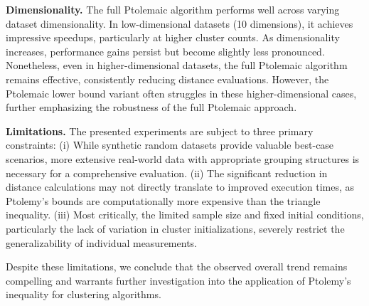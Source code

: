 \textbf{Dimensionality.} The full Ptolemaic algorithm performs well across varying dataset dimensionality. In low-dimensional datasets (10 dimensions), it achieves impressive speedups, particularly at higher cluster counts.
As dimensionality increases, performance gains persist but become slightly less pronounced.
Nonetheless, even in higher-dimensional datasets, the full Ptolemaic algorithm remains effective, consistently reducing distance evaluations.
However, the Ptolemaic lower bound variant often struggles in these higher-dimensional cases, further emphasizing the robustness of the full Ptolemaic approach.



\textbf{Limitations.}
The presented experiments are subject to three primary constraints:
(i) While synthetic random datasets provide valuable best-case scenarios, more extensive real-world data with appropriate grouping structures is necessary for a comprehensive evaluation.
(ii) The significant reduction in distance calculations may not directly translate to improved execution times, as Ptolemy's bounds are computationally more expensive than the triangle inequality.
(iii) Most critically, the limited sample size and fixed initial conditions, particularly the lack of variation in cluster initializations, severely restrict the generalizability of individual measurements.

Despite these limitations, we conclude that the observed overall trend remains compelling and warrants further investigation into the application of Ptolemy's inequality for clustering algorithms.



